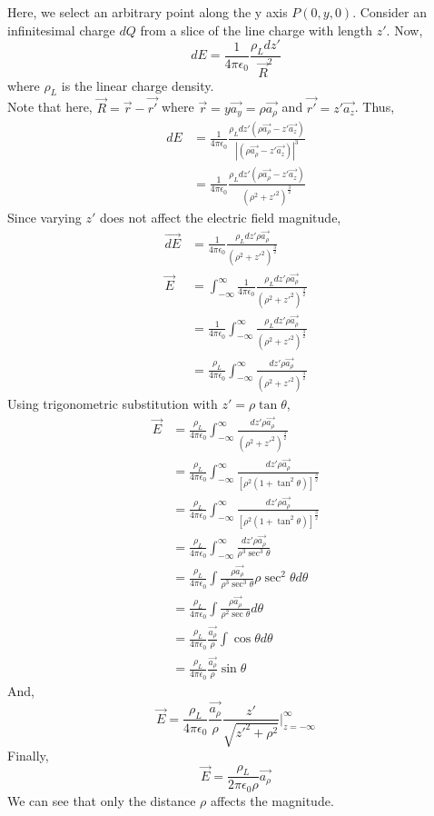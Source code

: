 \documentclass{article}
\begin{document}
\noindent
Here, we select an arbitrary point along the y axis $P(0,y,0)$.
\newpage 
\noindent 
Consider an infinitesimal charge $dQ$ from a slice of the line charge with length $z'$.
Now, $$dE = \frac{1}{4\pi\epsilon_0}\frac{\rho_L dz'}{\vec{R}^2}$$ where $\rho_L$ is
the linear charge density.
\vspace{8pt}
\\ Note that here, $\vec{R} = \vec{r} - \vec{r'}$ where $\vec{r} = y\vec{a_y} = 
\rho\vec{a_\rho}$ and $\vec{r'} = z'\vec{a_z}$. Thus, 
\begin{align*}
dE &= \frac{1}{4\pi\epsilon_0} \frac{\rho_L dz' (\rho\vec{a_\rho} - z'\vec{a_z})}
{|(\rho\vec{a_\rho} - z'\vec{a_z})|^3} \\
&= \frac{1}{4\pi\epsilon_0}\frac{\rho_L dz' (\rho\vec{a_\rho} - z'\vec{a_z})}
{(\rho^2 + z'^2)^\frac{3}{2}}
\end{align*}
Since varying $z'$ does not affect the electric field magnitude, 
\begin{align*}
\vec{dE} &= \frac{1}{4\pi\epsilon_0}\frac{\rho_L dz' \rho\vec{a_\rho}}
{(\rho^2 + z'^2)^\frac{3}{2}}\\
\vec{E} &= \int_{-\infty}^{\infty}\frac{1}{4\pi\epsilon_0}\frac{\rho_L dz' \rho\vec{a_\rho}}
{(\rho^2 + z'^2)^\frac{3}{2}}\\
&= \frac{1}{4\pi\epsilon_0} \int_{-\infty}^{\infty}\frac{\rho_L dz' \rho\vec{a_\rho}}
{(\rho^2 + z'^2)^\frac{3}{2}}\\
&= \frac{\rho_L}{4\pi\epsilon_0} \int_{-\infty}^{\infty}\frac{dz' \rho\vec{a_\rho}}
{(\rho^2 + z'^2)^\frac{3}{2}}
\end{align*}
Using trigonometric substitution with $z' =\rho \tan\theta$,
\begin{align*}
\vec{E} &= \frac{\rho_L}{4\pi\epsilon_0} \int_{-\infty}^{\infty}\frac{dz' \rho\vec{a_\rho}}
{(\rho^2 + z'^2)^\frac{3}{2}}\\
&= \frac{\rho_L}{4\pi\epsilon_0} \int_{-\infty}^{\infty}\frac{dz' \rho\vec{a_\rho}}
{[\rho^2(1+\tan^2\theta)]^\frac{3}{2}}\\
&= \frac{\rho_L}{4\pi\epsilon_0} \int_{-\infty}^{\infty}\frac{dz' \rho\vec{a_\rho}}
{[\rho^2(1+\tan^2\theta)]^\frac{3}{2}}\\
&= \frac{\rho_L}{4\pi\epsilon_0} \int_{-\infty}^{\infty}\frac{dz' \rho\vec{a_\rho}}
{\rho^3 \sec^3\theta}\\
&= \frac{\rho_L}{4\pi\epsilon_0} \int\frac{\rho\vec{a_\rho}}
{\rho^3 \sec^3\theta}\rho\sec^2\theta d\theta\\
&= \frac{\rho_L}{4\pi\epsilon_0} \int\frac{\rho\vec{a_\rho}}
{\rho^2 \sec\theta}d\theta \\
&= \frac{\rho_L}{4\pi\epsilon_0}\frac{\vec{a_\rho}}{\rho}\int
\cos\theta d\theta \\
&= \frac{\rho_L}{4\pi\epsilon_0}\frac{\vec{a_\rho}}{\rho}\sin\theta
\end{align*}
\noindent 
And,
\begin{equation*}
\vec{E}= \frac{\rho_L}{4\pi\epsilon_0}\frac{\vec{a_\rho}}{\rho}\frac{z'}{\sqrt{
    z'^2+\rho^2}} \Bigg|_{z=-\infty}^{\infty}
\end{equation*}
Finally,
$$ \boxed{\vec{E} = \frac{\rho_L}{2\pi\epsilon_0\rho}\vec{a_\rho}}$$
We can see that only the distance $\rho$ affects the magnitude. 
\end{document}
